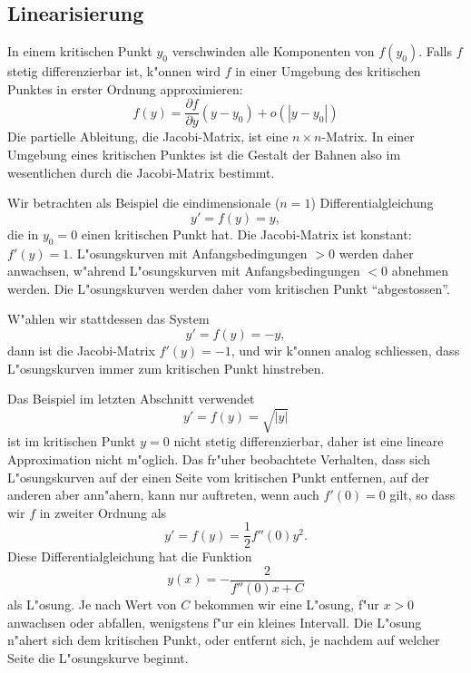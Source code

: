 %
%
\subsection{Linearisierung}
In einem kritischen Punkt $y_0$ verschwinden alle Komponenten von $f(y_0)$.
Falls $f$ stetig differenzierbar ist, k"onnen wird $f$ in einer Umgebung
des kritischen Punktes in erster Ordnung approximieren:
\[
f(y)=\frac{\partial f}{\partial y}(y-y_0) + o(|y-y_0|)
\]
Die partielle Ableitung, die Jacobi-Matrix, ist eine $n\times n$-Matrix.
In einer Umgebung eines kritischen Punktes ist die Gestalt der Bahnen also
im wesentlichen durch die Jacobi-Matrix bestimmt.

\begin{beispiel}
Wir betrachten als Beispiel die eindimensionale ($n=1$) Differentialgleichung
\[
y'=f(y)=y,
\]
die in $y_0=0$ einen kritischen Punkt hat.
Die Jacobi-Matrix ist konstant: $f'(y)=1$.
L"osungskurven mit Anfangsbedingungen $>0$ werden daher anwachsen,
w"ahrend L"osungskurven mit Anfangsbedingungen $<0$ abnehmen werden.
Die L"osungskurven werden daher vom kritischen Punkt ``abgestossen''.

W"ahlen wir stattdessen das System
\[
y'=f(y)=-y,
\]
dann ist die Jacobi-Matrix $f'(y)=-1$, und wir k"onnen analog schliessen,
dass L"osungskurven immer zum kritischen Punkt hinstreben.
\end{beispiel}

\begin{beispiel}
Das Beispiel im letzten Abschnitt verwendet
\[
y'=f(y)=\sqrt{|y|}
\]
ist im kritischen Punkt $y=0$ nicht stetig differenzierbar, daher ist
eine lineare Approximation nicht m"oglich.
Das fr"uher beobachtete Verhalten, dass sich L"osungskurven auf der
einen Seite vom kritischen Punkt entfernen, auf der anderen aber ann"ahern,
kann nur auftreten, wenn auch $f'(0)=0$ gilt, so dass wir $f$ in zweiter
Ordnung als
\[
y'=f(y)=\frac12 f''(0)y^2.
\]
Diese Differentialgleichung hat die Funktion
\[
y(x)=-\frac{2}{f''(0)x+C}
\]
als L"osung.
Je nach Wert von $C$ bekommen wir eine L"osung, f"ur $x>0$ anwachsen
oder abfallen, wenigstens f"ur ein kleines Intervall.
Die L"osung n"ahert sich dem kritischen Punkt, oder entfernt sich, je
nachdem auf welcher Seite die L"osungskurve beginnt.
\end{beispiel}

%
%

